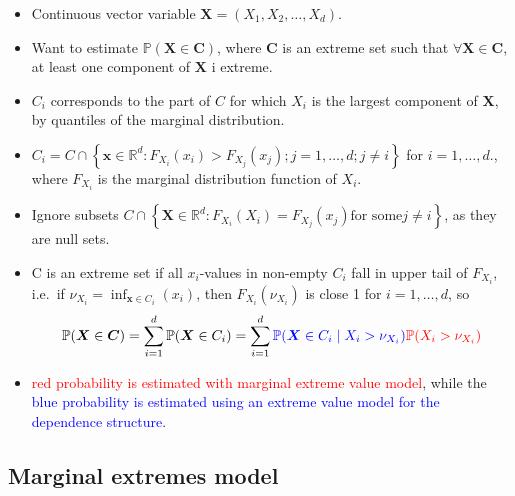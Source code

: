 \documentclass{article}
\numberwithin{equation}{section}
\begin{document}
\begin{itemize} 
  \item Continuous vector variable $\bm{X} = (X_1, X_2, \ldots, X_d)$. 
  \item Want to estimate $\mathbb{P}(\bm{X} \in \bm{C})$, where $\bm{C}$ is an extreme set such that $\forall \bm{X} \in \bm{C}$, at least one component of $\bm{X}$ i extreme. 
  \item $C_i$ corresponds to the part of $C$ for which $X_i$ is the largest component of $\bm{X}$, by quantiles of the marginal distribution. 
  \item $C_i = C \cap \left\{ \bm{x} \in \mathbb{R}^d: F_{X_i}(x_i) > F_{X_j}(x_j); j = 1, \ldots, d; j \ne i \right\}$ for $i = 1, \ldots, d$., where $F_{X_i}$ is the marginal distribution function of $X_i$. %
  \item Ignore subsets $C \cap \left\{ \bm{X} \in \mathbb{R}^d: F_{X_i}(X_i) = F_{X_j}(x_j) \text{for some} j \ne i \right\}$, as they are null sets. 
  \item C is an extreme set if all $x_i$-values in non-empty $C_i$ fall in upper tail of $F_{X_i}$, i.e.\ if $\nu_{X_i} = \inf_{\bm{x} \in C_i}{(x_i)}$, then $F_{X_i}(\nu_{X_i})$ is close 1 for $i = 1, \ldots, d$, so 
  \[
  \mathbb{P}(\bm{X} \in \bm{C}) = \sum_{i=1}^{d}{\mathbb{P}(\bm{X} \in C_i)} = \sum_{i=1}^{d}\textcolor{blue}{\mathbb{P}(\bm{X} \in C_i\mid X_i > \nu_{X_i})}\textcolor{red}{\mathbb{P}(X_i> \nu_{X_i})}
  \]
  \item \textcolor{red}{red probability is estimated with marginal extreme value model}, while the \textcolor{blue}{blue probability is estimated using an extreme value model for the dependence structure}. 
\end{itemize}

\subsection{Marginal extremes model}
\end{document}
